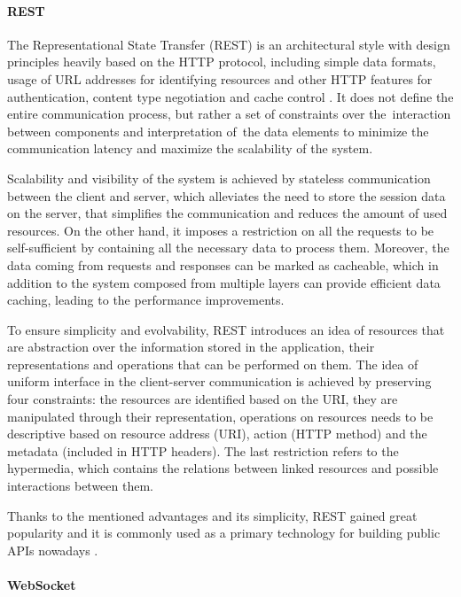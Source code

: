 \paragraph{REST}

The Representational State Transfer (REST) is an architectural style with design principles heavily based on the HTTP protocol, including simple data formats, usage of URL addresses for identifying resources and other HTTP features for authentication, content type negotiation and cache control \cite{RESTPrincipledDesingOfModernWebArchitecture}. It does not define the entire communication process, but rather a set of constraints over the~interaction between components and interpretation of~the data elements to minimize the communication latency and maximize the scalability of the system.

Scalability and visibility of the system is achieved by stateless communication between the client and server, which alleviates the need to store the session data on the server, that simplifies the communication and reduces the amount of used resources. On the other hand, it imposes a restriction on all the requests to be self-sufficient by containing all the necessary data to process them. Moreover, the data coming from requests and responses can be marked as cacheable, which in addition to the system composed from multiple layers can provide efficient data caching, leading to the performance improvements.

To ensure simplicity and evolvability, REST introduces an idea of resources that are abstraction over the information stored in the application, their representations and operations that can be performed on them.
The idea of uniform interface in the client-server communication is achieved by preserving four constraints: the resources are identified based on the URI, they are manipulated through their representation, operations on resources needs to be descriptive based on resource address (URI), action (HTTP method) and the metadata (included in HTTP headers). The last restriction refers to the hypermedia, which contains the relations between linked resources and possible interactions between them.

Thanks to the mentioned advantages and its simplicity, REST gained great popularity and it is commonly used as a primary technology for building public APIs nowadays \cite{APIDesignInDistributedSystems}.

\paragraph{WebSocket}

